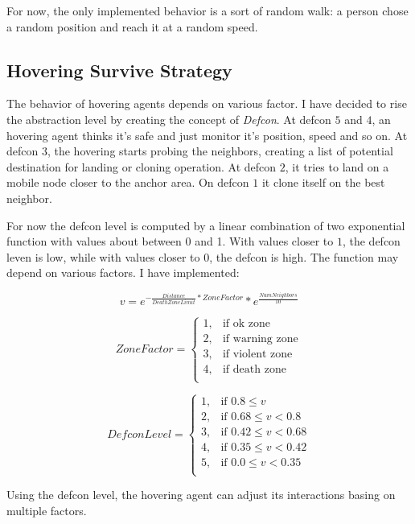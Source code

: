 For now, the only implemented behavior is a sort of random walk: a person chose
a random position and reach it at a random speed.

\subsection{Hovering Survive Strategy}

The behavior of hovering agents depends on various factor. I have decided to
rise the abstraction level by creating the concept of \emph{Defcon}. At defcon
$5$ and $4$, an hovering agent thinks it's safe and just monitor it's position,
speed and so on. At defcon $3$, the hovering starts probing the neighbors,
creating a list of potential destination for landing or cloning operation. At
defcon $2$, it tries to land on a mobile node closer to the anchor area. On
defcon $1$ it clone itself on the best neighbor.

For now the defcon level is computed by a linear combination of two exponential
function with values about between 0 and 1. With values closer to $1$, the
defcon leven is low, while with values closer to $0$, the defcon is
high. The function may depend on various factors. I have implemented:

\[
  v = e^{-\frac{Distance}{DeathZoneLimit}*ZoneFactor} * e^{\frac{NumNeighbors}{10}}
\]

\[
  ZoneFactor = \begin{cases}
    1, & \mbox{if } \mbox{ok zone} \\
    2, & \mbox{if } \mbox{warning zone} \\
    3, & \mbox{if } \mbox{violent zone} \\
    4, & \mbox{if } \mbox{death zone} \\
    \end{cases}
\]

\[
  DefconLevel = \begin{cases}
    1, & \mbox{if } 0.8  \leq v \\
    2, & \mbox{if } 0.68 \leq v < 0.8  \\
    3, & \mbox{if } 0.42 \leq v < 0.68  \\
    4, & \mbox{if } 0.35 \leq v < 0.42  \\
    5, & \mbox{if } 0.0  \leq v < 0.35  \\
    \end{cases}
\]

Using the defcon level, the hovering agent can adjust its interactions basing on
multiple factors.

